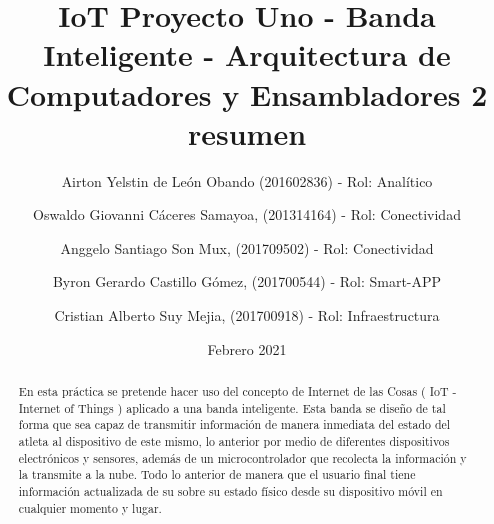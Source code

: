 \documentclass[osajnl,twocolumn,showpacs,superscriptaddress,10pt]{revtex4-1}
\begin{document}

\title{\Huge IoT Proyecto Uno -  Banda Inteligente - Arquitectura de Computadores y Ensambladores 2 }

\author{\newline Airton Yelstin de León Obando (201602836) - Rol: Analítico}
%

\author{\newline Oswaldo Giovanni Cáceres Samayoa, (201314164) - Rol: Conectividad}%
%
\author{\newline Anggelo Santiago Son Mux, (201709502) - Rol: Conectividad}%
%
\author{\newline Byron Gerardo Castillo Gómez, (201700544) - Rol: Smart-APP}%
%
\author{\newline Cristian Alberto Suy Mejia, (201700918) - Rol: Infraestructura}%
%
\date{Febrero 2021}



\begin{abstract}
\title {resumen}
En esta pr\'actica se pretende hacer uso del concepto de Internet de las Cosas ( IoT - Internet of Things ) aplicado a una banda inteligente. Esta banda se diseño de tal forma que sea capaz de transmitir informaci\'on de manera inmediata del estado del atleta al dispositivo de este mismo, lo anterior por medio de diferentes dispositivos electrónicos y sensores, adem\'as de un microcontrolador que recolecta la informaci\'on y la transmite a la nube. Todo lo anterior de manera que el usuario final tiene informaci\'on actualizada de su sobre su estado físico desde su dispositivo m\'ovil en cualquier momento y lugar.
\end{abstract}
\maketitle{}
\end{document}
